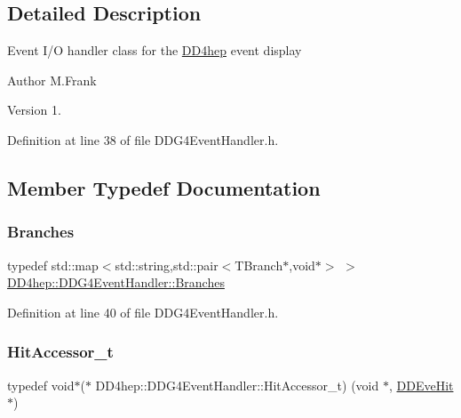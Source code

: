 \subsection{Detailed Description}
Event I/O handler class for the \hyperlink{namespace_d_d4hep}{D\+D4hep} event display

\begin{DoxyAuthor}{Author}
M.\+Frank 
\end{DoxyAuthor}
\begin{DoxyVersion}{Version}
1. 
\end{DoxyVersion}


Definition at line 38 of file D\+D\+G4\+Event\+Handler.\+h.



\subsection{Member Typedef Documentation}
\hypertarget{class_d_d4hep_1_1_d_d_g4_event_handler_accd112cdbf8673e3a80d97e2d5c98241}{}\label{class_d_d4hep_1_1_d_d_g4_event_handler_accd112cdbf8673e3a80d97e2d5c98241} 
\subsubsection{\texorpdfstring{Branches}{Branches}}
{\footnotesize\ttfamily typedef std\+::map$<$std\+::string,std\+::pair$<$T\+Branch$\ast$,void$\ast$$>$ $>$ \hyperlink{class_d_d4hep_1_1_d_d_g4_event_handler_accd112cdbf8673e3a80d97e2d5c98241}{D\+D4hep\+::\+D\+D\+G4\+Event\+Handler\+::\+Branches}}



Definition at line 40 of file D\+D\+G4\+Event\+Handler.\+h.

\hypertarget{class_d_d4hep_1_1_d_d_g4_event_handler_a523becfb4ac453b193adef28b8679d5c}{}\label{class_d_d4hep_1_1_d_d_g4_event_handler_a523becfb4ac453b193adef28b8679d5c} 
\subsubsection{\texorpdfstring{Hit\+Accessor\+\_\+t}{HitAccessor\_t}}
{\footnotesize\ttfamily typedef void$\ast$($\ast$ D\+D4hep\+::\+D\+D\+G4\+Event\+Handler\+::\+Hit\+Accessor\+\_\+t) (void $\ast$, \hyperlink{class_d_d4hep_1_1_d_d_eve_hit}{D\+D\+Eve\+Hit} $\ast$)}



